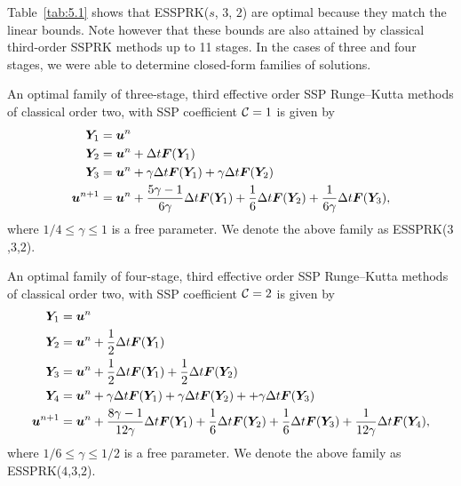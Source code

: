 Table~\ref{tab:5.1} shows that ESSPRK($s$, $3$, $2$) are optimal
because they match the linear bounds.
Note however that these bounds are also attained by classical
third-order SSPRK methods up to 11 stages.
In the cases of three and four stages, we were able to determine
closed-form families of solutions.

\begin{theorem}\label{thm:ESSPRK(3,3,2)}
  An optimal family of three-stage, third effective order
  SSP Runge--Kutta methods of classical order two, with SSP
  coefficient $\mathcal{C}=1$ is given by
    \begin{displaymath}
        \begin{split}
            \bm{Y}_{1} &= \bm{u}^{n} \\
            \bm{Y}_{2} &= \bm{u}^{n} + \Delta t\bm{F}(\bm{Y}_{1}) \\
            \bm{Y}_{3} &= \bm{u}^{n} + \gamma\Delta t\bm{F}(\bm{Y}_{1}) + \gamma\Delta t\bm{F}(\bm{Y}_{2}) \\
            \bm{u}^{n+1} &= \bm{u}^{n} + \frac{5\gamma-1}{6\gamma}\Delta t\bm{F}(\bm{Y}_{1}) + \frac{1}{6}\Delta t\bm{F}(\bm{Y}_{2}) + \frac{1}{6\gamma}\Delta t\bm{F}(\bm{Y}_{3}),
        \end{split}
    \end{displaymath}
    where \( 1/4 \leq \gamma \leq 1 \) is a free parameter. We denote the above family as ESSPRK($3$,$3$,$2$).
\end{theorem}

\begin{theorem}\label{thm:ESSPRK(4,3,2)}
  An optimal family of four-stage, third effective order
  SSP Runge--Kutta methods of classical order two, with SSP
  coefficient $\mathcal{C}=2$ is given by
    \begin{displaymath}
        \begin{split}
            \bm{Y}_{1} &= \bm{u}^{n} \\
            \bm{Y}_{2} &= \bm{u}^{n} + \frac{1}{2}\Delta t\bm{F}(\bm{Y}_{1}) \\
            \bm{Y}_{3} &= \bm{u}^{n} + \frac{1}{2}\Delta t\bm{F}(\bm{Y}_{1}) + \frac{1}{2}\Delta t\bm{F}(\bm{Y}_{2}) \\
            \bm{Y}_{4} &= \bm{u}^{n} + \gamma\Delta t\bm{F}(\bm{Y}_{1}) + \gamma\Delta t\bm{F}(\bm{Y}_{2}) + + \gamma\Delta t\bm{F}(\bm{Y}_{3}) \\
            \bm{u}^{n+1} &= \bm{u}^{n} + \frac{8\gamma-1}{12\gamma}\Delta t\bm{F}(\bm{Y}_{1}) + \frac{1}{6}\Delta t\bm{F}(\bm{Y}_{2}) + \frac{1}{6}\Delta t\bm{F}(\bm{Y}_{3}) + \frac{1}{12\gamma}\Delta t\bm{F}(\bm{Y}_{4}),
        \end{split}
    \end{displaymath}
    where $ 1/6 \leq \gamma \leq 1/2 $ is a free parameter. We denote the above family as ESSPRK($4$,$3$,$2$).
\end{theorem}

